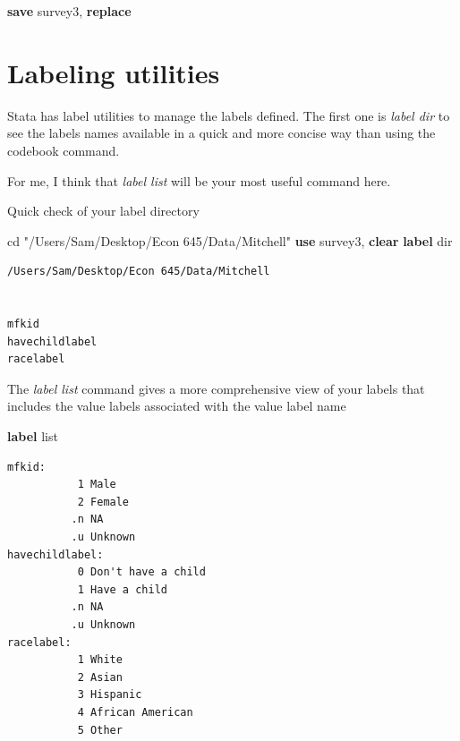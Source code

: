 \documentclass[
]{book}
\newenvironment{Shaded}{\begin{snugshade}}{\end{snugshade}}
\newcommand{\KeywordTok}[1]{\textcolor[rgb]{0.13,0.29,0.53}{\textbf{#1}}}
\newcommand{\NormalTok}[1]{#1}
\newcommand{\OtherTok}[1]{\textcolor[rgb]{0.56,0.35,0.01}{#1}}
\newcommand{\StringTok}[1]{\textcolor[rgb]{0.31,0.60,0.02}{#1}}
\begin{document}
\begin{Shaded}
\begin{Highlighting}[]
\KeywordTok{save}\NormalTok{ survey3, }\KeywordTok{replace}
\end{Highlighting}
\end{Shaded}

\section{Labeling utilities}\label{labeling-utilities}

Stata has label utilities to manage the labels defined. The first one is \emph{label dir} to see the labels names available in a quick and more concise way than using the codebook command.

For me, I think that \emph{label list} will be your most useful command here.

Quick check of your label directory

\begin{Shaded}
\begin{Highlighting}[]
\NormalTok{cd }\StringTok{"/Users/Sam/Desktop/Econ 645/Data/Mitchell"}
\KeywordTok{use}\NormalTok{ survey3, }\KeywordTok{clear}
\KeywordTok{label} \OtherTok{dir}
\end{Highlighting}
\end{Shaded}

\begin{verbatim}
/Users/Sam/Desktop/Econ 645/Data/Mitchell


mfkid
havechildlabel
racelabel
\end{verbatim}

The \emph{label list} command gives a more comprehensive view of your labels that includes the value labels associated with the value label name

\begin{Shaded}
\begin{Highlighting}[]
\KeywordTok{label} \OtherTok{list}
\end{Highlighting}
\end{Shaded}

\begin{verbatim}
mfkid:
           1 Male
           2 Female
          .n NA
          .u Unknown
havechildlabel:
           0 Don't have a child
           1 Have a child
          .n NA
          .u Unknown
racelabel:
           1 White
           2 Asian
           3 Hispanic
           4 African American
           5 Other
\end{verbatim}
\end{document}
